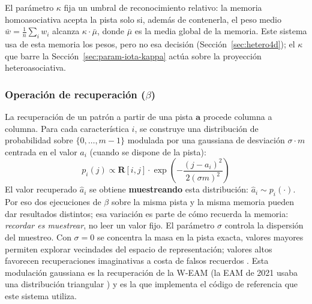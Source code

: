 El parámetro $\kappa$ fija un umbral de reconocimiento relativo: la memoria
homoasociativa acepta la pista solo si, además de contenerla, el peso medio
$\bar{w} = \frac{1}{n}\sum_i w_i$ alcanza $\kappa \cdot \bar{\mu}$, donde $\bar{\mu}$ es
la media global de la memoria.
Este sistema usa de esta memoria los pesos, pero no esa decisión
(Sección~\ref{sec:hetero4d}); el $\kappa$ que barre la
Sección~\ref{sec:param-iota-kappa} actúa sobre la proyección heteroasociativa.

\subsubsection*{Operación de recuperación ($\beta$)}

La recuperación de un patrón a partir de una pista $\mathbf{a}$ procede columna a columna.
Para cada característica $i$, se construye una distribución de probabilidad sobre $\{0,\ldots,m-1\}$
modulada por una gaussiana de desviación $\sigma \cdot m$ centrada en el valor $a_i$
(cuando se dispone de la pista):
\begin{equation}
    p_i(j) \propto \mathbf{R}[i, j] \cdot \exp\!\left(-\frac{(j - a_i)^2}{2(\sigma m)^2}\right)
    \label{eq:distribucion-recuperacion}
\end{equation}
El valor recuperado $\hat{a}_i$ se obtiene \textbf{muestreando} esta distribución:
$\hat{a}_i \sim p_i(\cdot)$.
Por eso dos ejecuciones de $\beta$ sobre la misma pista y la misma memoria pueden dar
resultados distintos; esa variación es parte de cómo recuerda la memoria:
\emph{recordar es muestrear}, no leer un valor fijo.
El parámetro $\sigma$ controla la dispersión del muestreo.
Con $\sigma = 0$ se concentra la masa en la pista exacta, valores mayores permiten
explorar vecindades del espacio de representación; valores altos favorecen
recuperaciones imaginativas a costa de falsos recuerdos \cite{pineda2023imagery}.
Esta modulación gaussiana es la recuperación de la W-EAM \cite{pineda2022weighted}
(la EAM de 2021 usaba una distribución triangular \cite{pineda2021entropic}) y es la
que implementa el código de referencia que este sistema utiliza.

